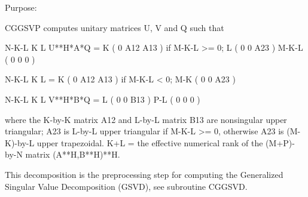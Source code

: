  \begin{DoxyParagraph}{Purpose\+: }
\begin{DoxyVerb} CGGSVP computes unitary matrices U, V and Q such that

                    N-K-L  K    L
  U**H*A*Q =     K ( 0    A12  A13 )  if M-K-L >= 0;
                 L ( 0     0   A23 )
             M-K-L ( 0     0    0  )

                  N-K-L  K    L
         =     K ( 0    A12  A13 )  if M-K-L < 0;
             M-K ( 0     0   A23 )

                  N-K-L  K    L
  V**H*B*Q =   L ( 0     0   B13 )
             P-L ( 0     0    0  )

 where the K-by-K matrix A12 and L-by-L matrix B13 are nonsingular
 upper triangular; A23 is L-by-L upper triangular if M-K-L >= 0,
 otherwise A23 is (M-K)-by-L upper trapezoidal.  K+L = the effective
 numerical rank of the (M+P)-by-N matrix (A**H,B**H)**H. 

 This decomposition is the preprocessing step for computing the
 Generalized Singular Value Decomposition (GSVD), see subroutine
 CGGSVD.\end{DoxyVerb}
 
\end{DoxyParagraph}

